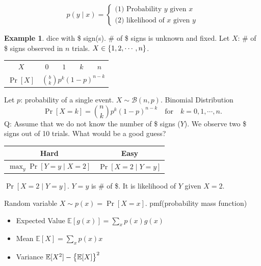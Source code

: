 \documentclass[12pt,openany]{book}
\theoremstyle{definition}
\newtheorem{example}{Example}[chapter]
\newcommand{\E}{\mathbb{E}}
\begin{document}
	\[
	p(y\mid x)=\begin{cases}
		\text{(1) Probability $y$ given $x$}\\
		\text{(2) likelihood of $x$ given $y$}
	\end{cases}
	\]
	
	\begin{example}
		dice with \$ sign(s). \# of \$ signs is unknown and fixed.
		Let $X$: \# of \$ signs observed in $n$ trials. $X\in\set{1,2,\cdots,n}$.
		\begin{center}
			\begin{tabular}{c|cccc}
				$X$ & $0$ & $1$ & $k$ & $n$\\
				$\Pr[X]$ & \multicolumn{4}{c}{$\binom{b}{k}p^k(1-p)^{n-k}$}
			\end{tabular}
		\end{center} Let $p$: probability of a single event. $X\sim\mathcal{B}(n,p)$. Binomial Distribution
		\[
		\Pr[X=k]=\binom{n}{k}p^k(1-p)^{n-k}\quad\text{for}\quad k=0,1,\cdots, n.	
		\]
		Q: Assume that we do not know the number of \$ signs ($Y$). We observe two \$ signs out of 10 trials. What would be a good guess? \begin{center}
			\begin{tabular}{c|c}
				Hard & Easy\\
				\hline
				$\max_y\Pr[Y=y\mid X=2]$ & $\Pr[X=2\mid Y=y]$
			\end{tabular}
		\end{center}
		$\Pr[X=2\mid Y=y]$. $Y=y$ is \# of \$. It is likelihood of $Y$ given $X=2$.
	\end{example}
	
	Random variable $X\sim p(x)=\Pr[X=x]$. pmf(probability mass function)
	\begin{itemize}
		\item Expected Value $\E[g(x)]=\sum_xp(x)g(x)$
		\item Mean $\E[X]=\sum_xp(x)x$
		\item Variance $\E[X^2]-\set{\E[X]}^2$
	\end{itemize}
	
\end{document}
